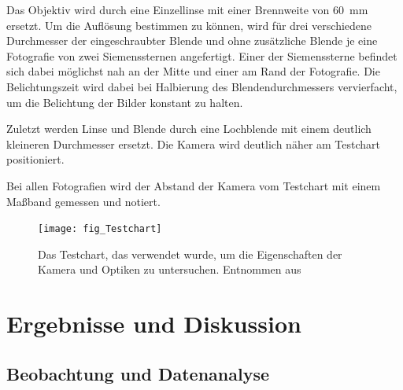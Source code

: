 \documentclass[
	a4paper,
	12pt,
	pagesize,
	ngerman
]{scrartcl}
\begin{document}
	Das Objektiv wird durch eine Einzellinse mit einer Brennweite von \SI{60}{\milli \meter} ersetzt.
	Um die 	Auflösung bestimmen zu können, wird für drei verschiedene Durchmesser der eingeschraubter Blende und ohne zusätzliche Blende je eine Fotografie von zwei Siemenssternen angefertigt.
	Einer der Siemenssterne befindet sich dabei möglichst nah an der Mitte und einer am Rand der Fotografie.
	Die Belichtungszeit wird dabei bei Halbierung des Blendendurchmessers vervierfacht, um die Belichtung der Bilder konstant zu halten.
	
	Zuletzt werden Linse und Blende durch eine Lochblende mit einem deutlich kleineren Durchmesser ersetzt. %
	Die Kamera wird deutlich näher am Testchart positioniert.
	
	Bei allen Fotografien wird der Abstand der Kamera vom Testchart mit einem Maßband gemessen und notiert.
	\begin{figure}[H] 
		\texttt{[image: fig\_Testchart]}
		\centering
		\caption{Das Testchart, das verwendet wurde, um die Eigenschaften der Kamera und Optiken zu untersuchen. Entnommen aus \cite{Testchart}} %
		\label{fig_testchart}
		\centering
	\end{figure}
	\section{Ergebnisse und Diskussion}
	

	\subsection{Beobachtung und Datenanalyse}
\end{document}

